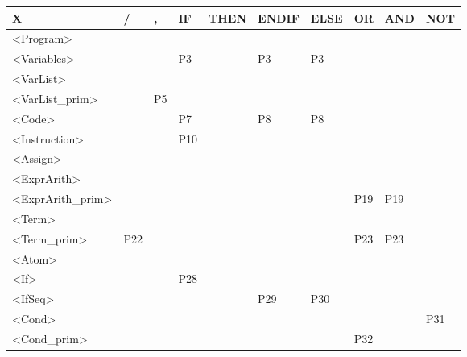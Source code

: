 \documentclass[12pt]{article}
\begin{document}
\begin{table}[H]
	\begin{tabular}{|l|l|l|l|l|l|l|l|l|l|}
		\hline
		X                                        & /   & ,   & IF  & THEN & ENDIF & ELSE & OR  & AND & NOT \\ \hline
		\textless{}Program\textgreater{}         &     &     &     &      &       &      &     &     &     \\ \hline
		\textless{}Variables\textgreater{}       &     &     & P3  &      & P3    & P3   &     &     &     \\ \hline
		\textless{}VarList\textgreater{}         &     &     &     &      &       &      &     &     &     \\ \hline
		\textless{}VarList\_prim\textgreater{}   &     & P5  &     &      &       &      &     &     &     \\ \hline
		\textless{}Code\textgreater{}            &     &     & P7  &      & P8    & P8   &     &     &     \\ \hline
		\textless{}Instruction\textgreater{}     &     &     & P10 &      &       &      &     &     &     \\ \hline
		\textless{}Assign\textgreater{}          &     &     &     &      &       &      &     &     &     \\ \hline
		\textless{}ExprArith\textgreater{}       &     &     &     &      &       &      &     &     &     \\ \hline
		\textless{}ExprArith\_prim\textgreater{} &     &     &     &      &       &      & P19 & P19 &     \\ \hline
		\textless{}Term\textgreater{}            &     &     &     &      &       &      &     &     &     \\ \hline
		\textless{}Term\_prim\textgreater{}      & P22 &     &     &      &       &      & P23 & P23 &     \\ \hline
		\textless{}Atom\textgreater{}            &     &     &     &      &       &      &     &     &     \\ \hline
		\textless{}If\textgreater{}              &     &     & P28 &      &       &      &     &     &     \\ \hline
		\textless{}IfSeq\textgreater{}           &     &     &     &      & P29   & P30  &     &     &     \\ \hline
		\textless{}Cond\textgreater{}            &     &     &     &      &       &      &     &     & P31 \\ \hline
		\textless{}Cond\_prim\textgreater{}      &     &     &     &      &       &      & P32 &     &     \\ \hline

\end{tabular}
\end{table}
\end{document}
